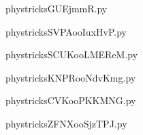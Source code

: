     \newcommand{\CaptionFigGUEjmmR}{<+Type your caption here+>}
    \begin{center}
        
    \end{center}
    phystricksGUEjmmR.py

    

    \clearpage
    


    \newcommand{\CaptionFigSVPAooIuxHvP}{<+Type your caption here+>}
    \begin{center}
        
    \end{center}
    phystricksSVPAooIuxHvP.py

    

    \clearpage
    


    \newcommand{\CaptionFigSCUKooLMEReM}{<+Type your caption here+>}
    \begin{center}
        
    \end{center}
    phystricksSCUKooLMEReM.py

    

    \clearpage
    


    \newcommand{\CaptionFigKNPRooNdvKmg}{<+Type your caption here+>}
    \begin{center}
        
    \end{center}
    phystricksKNPRooNdvKmg.py

    

    \clearpage
    


    \newcommand{\CaptionFigCVKooPKKMNG}{<+Type your caption here+>}
    \begin{center}
        
    \end{center}
    phystricksCVKooPKKMNG.py

    

    \clearpage
    


    \newcommand{\CaptionFigZFNXooSjzTPJ}{<+Type your caption here+>}
    \begin{center}
        
    \end{center}
    phystricksZFNXooSjzTPJ.py

